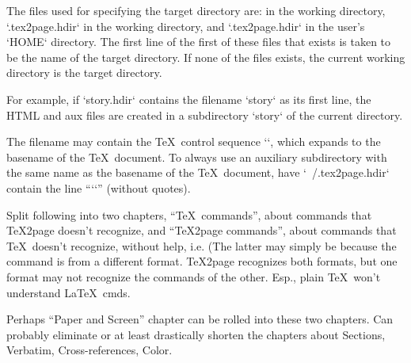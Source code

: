 The files used for specifying the target directory are:
 in the working directory,
`.tex2page.hdir` in the working directory, and
`.tex2page.hdir` in the user’s `HOME` directory.
The first line of the first of these files that exists
is taken to be the name of the target directory.
If none of the files exists, the current working
directory is the target directory.

For example, if `story.hdir` contains the filename
`story` as its first line, the HTML and aux files are
created in a subdirectory `story` of the
current directory.


The filename may contain the \TeX\ control sequence
`\jobname`, which expands to the basename of
the \TeX\ document.  To always use an auxiliary
subdirectory with the same name as the basename of the
\TeX\ document, have `~/.tex2page.hdir` contain the
line “`\jobname`” (without quotes).

\iffalse
beginsection Info files

If a \TeX2page-generated set of HTML files is largely text, it can be
read using text-based browsers such as Lynx~\cite{lynx}.  However, many
people would rather view it as an Info~\cite{texinfo} document. Info files can be
browsed very rapidly in a text editor or a lightweight console browser;
allow convenient regex search across the entire document; and can
be read as plain text as they have much less markup than the
corresponding HTML.

The \TeX2page distribution includes a script `t2p2info` for converting
\TeX2page-generated HTML into Info.  `t2p2info` takes as argument the
filename of the main HTML file generated by \TeX2page, e.g.,

\begintt
t2p2info jobname.html
\endtt
The result is one or more Info files, the first of them named
`jobname.info`.
\fi

\iffalse
Split following into two chapters, “\TeX\ commands”, about
commands that \TeX2page doesn’t recognize,
and
“\TeX2page commands”, about commands that \TeX\ doesn’t
recognize, without help, i.e.  (The latter may simply be
because the command is from a different format.  \TeX2page
recognizes both formats, but one format may not recognize
the commands of the other.  Esp., plain \TeX\ won’t understand
\LaTeX\ cmds.

Perhaps “Paper and Screen” chapter can be rolled into these
two chapters.  Can probably eliminate or at least
drastically shorten the chapters about
Sections, Verbatim, Cross-references, Color.

